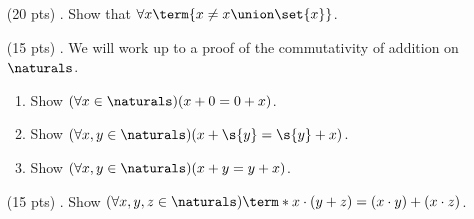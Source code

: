 \begin{enumerate}
\begin{mdframed}
\begin{proof}
\begin{case}
          Let $\ell, r \in P$.
          If $\ell \in L \land r \in L$, then $\alpha(\ell) = \alpha(r)$.
          Similarly, if $\ell \in R \land r \in R$, then $\alpha(\ell) = \alpha(r)$.
          Now, suppose $\ell \in L \land r \in R$.
          \begin{equation*}
            \alpha(\ell) = \alpha(p_1) = \alpha(p_2) = \alpha(p_{k + 1}) = \alpha(r)
          \end{equation*}
          So, all people in $P$ have the same age.
        \end{case}
        Therefore, everyone on Earth has the same age.
      \end{proof}
    \end{mdframed}

  \item[(20 pts) \quad 2.]
    Show that $\forall x \term{x \neq x \union \set{x}}$.

  \item[(15 pts) \quad 3.]
    We will work up to a proof of the commutativity of addition on $\naturals$.
    \begin{enumerate}
      \item
        Show $(\forall x \in \naturals)(x + 0 = 0 + x)$.
      \item
        Show $(\forall x, y \in \naturals)(x + \s{y} = \s{y} + x)$.
      \item
        Show $(\forall x, y \in \naturals)(x + y = y + x)$.
    \end{enumerate}

  \item[(15 pts) \quad 4.]
    Show $(\forall x, y, z \in \naturals)\term*{x \cdot (y + z) = (x \cdot y) + (x \cdot z)}$.




\end{enumerate}
